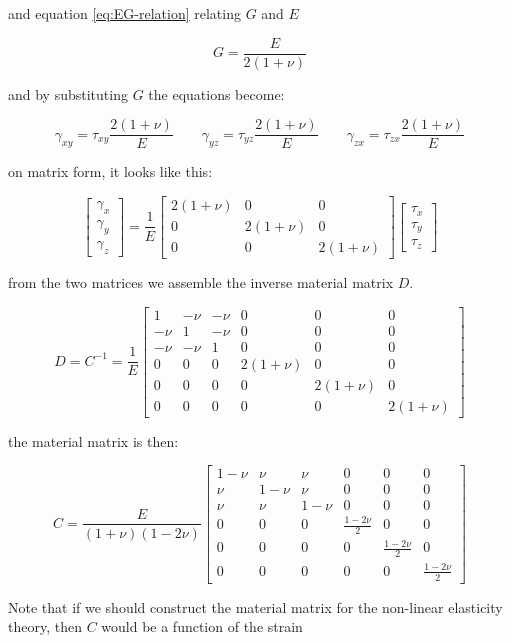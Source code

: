 and equation \eqref{eq:EG-relation} relating
$G$ and $E$

\begin{equation*}
G = \frac{E}{2(1+\nu)}
\end{equation*}

and by substituting $G$ the equations become:

\begin{equation}
  \gamma_{xy} = \tau_{xy} \frac{2(1+\nu)}{E}
  \qquad
  \gamma_{yz} = \tau_{yz} \frac{2(1+\nu)}{E}
  \qquad
  \gamma_{zx} = \tau_{zx} \frac{2(1+\nu)}{E}
\end{equation}

on matrix form, it looks like this:

\begin{equation}
\begin{bmatrix}
\gamma_x \\ \gamma_y \\ \gamma_z
\end{bmatrix}
=
\frac{1}{E}
\begin{bmatrix}
  2(1+\nu) & 0 & 0 \\
  0 & 2(1+\nu) & 0 \\
  0 & 0 & 2(1+\nu)
\end{bmatrix}
\begin{bmatrix}
  \tau_x \\ \tau_y \\ \tau_z
\end{bmatrix}
\end{equation}

from the two matrices we assemble the inverse material matrix $D$.

\begin{equation}
\label{eq:D-3d}
D = C^{-1} = \frac{1}{E} 
\begin{bmatrix}
  1 & - \nu & - \nu & 0 & 0 & 0 \\
  - \nu & 1 & - \nu & 0 & 0 & 0 \\
  - \nu & - \nu & 1 & 0 & 0 & 0 \\
  0 & 0 & 0 & 2(1+\nu) & 0 & 0 \\
  0 & 0 & 0 & 0 & 2(1+\nu) & 0 \\
  0 & 0 & 0 & 0 & 0 & 2(1+\nu)
\end{bmatrix}
\end{equation}

the material matrix is then:

\begin{equation}
\label{eq:C-3d}
C = \frac{E}{(1+\nu)(1-2\nu)} 
\begin{bmatrix}
  1-\nu & \nu & \nu & 0 & 0 & 0 \\
  \nu & 1-\nu & \nu & 0 & 0 & 0 \\
  \nu & \nu & 1-\nu & 0 & 0 & 0 \\
  0 & 0 & 0 & \frac{1-2\nu}{2} & 0 & 0 \\
  0 & 0 & 0 & 0 & \frac{1-2\nu}{2} & 0 \\
  0 & 0 & 0 & 0 & 0 & \frac{1-2\nu}{2}
\end{bmatrix}
\end{equation}

Note that if we should construct the material matrix for the
non-linear elasticity theory, then $C$ would be a function of the strain
